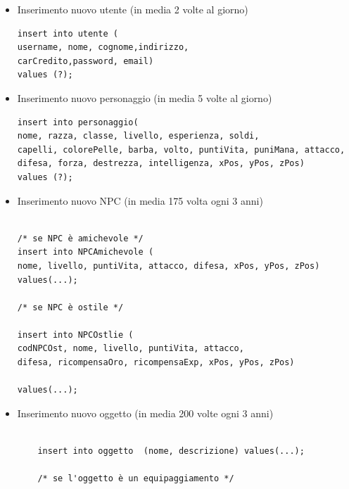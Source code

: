 


\begin{itemize}

\item Inserimento nuovo utente (in media 2 volte al giorno)

\begin{verbatim}
insert into utente (
username, nome, cognome,indirizzo,
carCredito,password, email)
values (?);
\end{verbatim} 

\item Inserimento nuovo personaggio (in media 5 volte al giorno)

\begin{verbatim}insert into personaggio(
nome, razza, classe, livello, esperienza, soldi,
capelli, colorePelle, barba, volto, puntiVita, puniMana, attacco,
difesa, forza, destrezza, intelligenza, xPos, yPos, zPos)
values (?); 

\end{verbatim}
\item Inserimento nuovo NPC (in media 175 volta ogni 3 anni)

\begin{verbatim}

/* se NPC è amichevole */
insert into NPCAmichevole (
nome, livello, puntiVita, attacco, difesa, xPos, yPos, zPos) 
values(...);

/* se NPC è ostile */

insert into NPCOstlie (
codNPCOst, nome, livello, puntiVita, attacco,
difesa, ricompensaOro, ricompensaExp, xPos, yPos, zPos)

values(...);
\end{verbatim}

\item Inserimento nuovo oggetto (in media 200 volte ogni 3 anni)

\begin{verbatim}

	insert into oggetto  (nome, descrizione) values(...);

	/* se l'oggetto è un equipaggiamento */
	

\end{verbatim}
\end{itemize}
